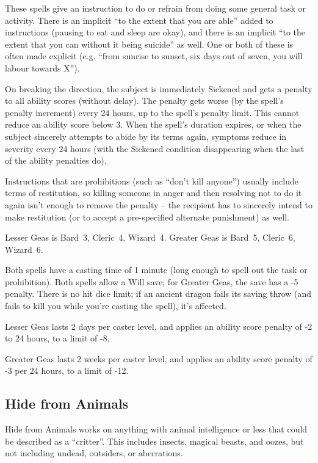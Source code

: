 These spells give an instruction to do or refrain from doing some general
task or activity. There is an implicit ``to the extent that you are able''
added to instructions (pausing to eat and sleep are okay), and there is an
implicit ``to the extent that you can without it being suicide'' as well.
One or both of these is often made explicit (e.g. ``from sunrise to sunset,
six days out of seven, you will labour towards X'').

On breaking the direction, the subject is immediately Sickened and gets a
penalty to all ability scores (without delay). The penalty gets worse (by
the spell's penalty increment) every 24 hours, up to the spell's penalty
limit. This cannot reduce an ability score below 3. When the spell's
duration expires, or when the subject sincerely attempts to abide by its
terms again, symptoms reduce in severity every 24 hours (with the Sickened
condition disappearing when the last of the ability penalties do).

Instructions that are prohibitions (such as ``don't kill anyone'') usually
include terms of restitution, so killing someone in anger and then resolving
not to do it again isn't enough to remove the penalty -- the recipient has
to sincerely intend to make restitution (or to accept a pre-specified
alternate punishment) as well.

Lesser Geas is Bard~3, Cleric~4, Wizard~4.
Greater Geas is Bard~5, Cleric~6, Wizard~6.

Both spells have a casting time of 1 minute (long enough to spell out the
task or prohibition). Both spells allow a Will save; for Greater Geas, the
save has a -5 penalty. There is no hit dice limit; if an ancient dragon
fails its saving throw (and fails to kill you while you're casting the
spell), it's affected.

Lesser Geas lasts 2 days per caster level, and applies an ability score
penalty of -2 to 24 hours, to a limit of -8.

Greater Geas lasts 2 weeks per caster level, and applies an ability score
penalty of -3 per 24 hours, to a limit of -12.
%

%
\subsection{Hide from Animals}

Hide from Animals works on anything with animal intelligence or less that
could be described as a ``critter''. This includes insects, magical beasts,
and oozes, but not including undead, outsiders, or aberrations.
%

